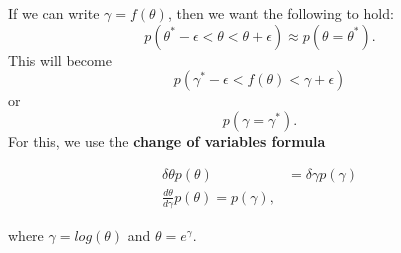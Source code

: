 \documentclass[titlepage, 12pt, leqno]{article}
\begin{document}
If we can write $\gamma = f(\theta)$, then we want the following to hold:
\[
p(\theta^{*}- \epsilon < \theta < \theta + \epsilon) \approx p(\theta = 
\theta^{*}).
\]
This will become
\[
    p(\gamma^{*} - \epsilon < f(\theta) < \gamma + \epsilon)
\]
or
\[
    p(\gamma = \gamma^{*}).
\]
For this, we use the \textbf{change of variables formula}

\begin{align*}
    \delta\theta p(\theta) &= \delta\gamma p(\gamma) \\
    \frac{d \theta}{d\gamma}p(\theta) = p(\gamma),
\end{align*}

where $\gamma = log(\theta)$ and $\theta = e^{\gamma}$.
\end{document}

